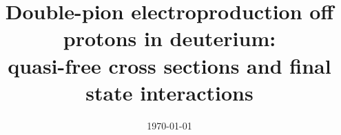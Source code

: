 \documentclass[prc,twocolumn,superscriptaddress,showpacs,amssymb,amsmath,amsfonts,aps,nofootinbib]{revtex4-1}
\begin{document}
\linenumbers


\date{\today}
\title{\large Double-pion electroproduction off protons in deuterium: \\quasi-free cross sections and final state interactions \\}




\end{document}
